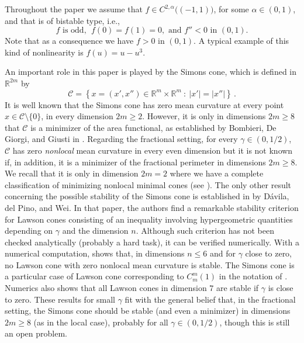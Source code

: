 \documentclass[12pt,reqno]{amsart}
\theoremstyle{definition}
\theoremstyle{remark}
\newcommand{\con}[1]{\mathbb{#1}}
\newcommand{\R}{\con{R}} %
\newcommand{\ccal}{\mathscr{C}}
\newcommand{\s}{\gamma}
\newcommand{\setcond}[2]{\left \{ #1 \ : \ #2  \right \}}
\numberwithin{equation}{section}
\begin{document}
Throughout the paper we assume that $f\in C^{2,\alpha}\big((-1,1)\big)$, for some $\alpha\in (0,1)$, and that is of bistable type, i.e.,
\begin{equation}\label{Eq:fHypotheses}
f \text{ is odd, }\; f(0)=f(1)=0,\text{ and }
f''<0 \text{ in } (0,1).
\end{equation}
Note that as a consequence we have $f>0$ in $(0,1)$. A typical example of this kind of nonlinearity is $f(u)=u-u^3$.

An important role in this paper is played by the Simons cone, which is defined in $\R^{2m}$ by
$$
\mathscr{C} = \setcond{x = (x', x'') \in \R^{m}\times \R^m}{|x'| = |x''|}\,.
$$
It is well known that the Simons cone has zero mean curvature at every point $x \in \ccal \setminus \{0\}$, in every dimension $2m \geq 2$. However, it is only in dimensions $2m \geq 8$ that $\ccal$ is a minimizer of the area functional, as established by Bombieri, De Giorgi, and Giusti in \cite{BombieriDeGiorgiGiusti}. Regarding the fractional setting, for every $\s\in(0,1/2)$, $\ccal$ has zero \emph{nonlocal} mean curvature in every even dimension but it is not known if, in addition,  it is a minimizer of the fractional perimeter in dimensions $2m\geq 8$. We recall that it is only in dimension $2m=2$ where we have a complete classification of minimizing nonlocal minimal cones (see \cite{SavinValdinoci-Cones}). The only other result concerning the possible stability of the Simons cone is established in \cite{DaviladelPinoWei} by Dávila, del Pino, and Wei. In that paper, the authors find a remarkable stability criterion for Lawson cones consisting of an inequality involving hypergeometric quantities depending on $\s$ and the dimension $n$. Although such criterion has not been checked analytically (probably a hard task), it can be verified numerically. With a numerical computation, \cite{DaviladelPinoWei} shows that, in dimensions $n \leq 6$ and for $\s $ close to zero, no Lawson cone with zero nonlocal mean curvature is stable. The Simons cone is a particular case of Lawson cone corresponding to $C_m^m(1)$ in the notation of \cite{DaviladelPinoWei}. Numerics also shows that all Lawson cones in dimension $7$ are stable if $\s$ is close to zero. These results for small $\s$ fit with the general belief that, in the fractional setting, the Simons cone should be stable (and even a minimizer) in dimensions $2m \geq 8$ (as in the local case), probably for all $\s\in(0,1/2)$, though this is still an open problem. 
\end{document}
